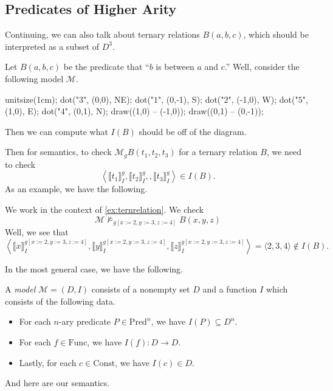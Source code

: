 \documentclass[../notes.tex]{subfiles}
\begin{document}
\subsection{Predicates of Higher Arity}
Continuing, we can also talk about ternary relations $B(a,b,c)$, which should be interpreted as a subset of $D^3$.
\begin{example} \label{ex:ternrelation}
	Let $B(a,b,c)$ be the predicate that ``$b$ is between $a$ and $c$.'' Well, consider the following model $\mathcal M$.
	\begin{center}
		\begin{asy}
			unitsize(1cm);
			dot("$3$", (0,0), NE);
			dot("$1$", (0,-1), S);
			dot("$2$", (-1,0), W);
			dot("$5$", (1,0), E);
			dot("$4$", (0,1), N);
			draw((1,0) -- (-1,0));
			draw((0,1) -- (0,-1));
		\end{asy}
	\end{center}
	Then we can compute what $I(B)$ should be off of the diagram.
\end{example}
Then for semantics, to check $\mathcal M_gB(t_1,t_2,t_3)$ for a ternary relation $B$, we need to check
\[\left\langle\llbracket t_1\rrbracket_I^g,\llbracket t_2\rrbracket_I^g,,\llbracket t_3\rrbracket_I^g\right\rangle\in I(B).\]
As an example, we have the following.
\begin{example}
	We work in the context of \autoref{ex:ternrelation}. We check
	\[\mathcal M\nvDash_{g[x:=2,y:=3,z:=4]}B(x,y,z)\]
	Well, we see that
	\[\left\langle\llbracket x\rrbracket_I^{g[x:=2,y:=3,z:=4]},\llbracket y\rrbracket_I^{g[x:=2,y:=3,z:=4]},\llbracket z\rrbracket_I^{g[x:=2,y:=3,z:=4]}\right\rangle=\langle2,3,4\rangle\notin I(B).\]
\end{example}
In the most general case, we have the following.
\begin{defihelper}[Model]
	A \textit{model} $\mathcal M=(D,I)$ consists of a nonempty set $D$ and a function $I$ which consists of the following data.
	\begin{itemize}
		\item For each $n$-ary predicate $P\in\mathrm{Pred}^n$, we have $I(P)\subseteq D^n$.
		\item For each $f\in\mathrm{Func}$, we have $I(f):D\to D$.
		\item Lastly, for each $c\in\mathrm{Const}$, we have $I(c)\in D$.
	\end{itemize}
\end{defihelper}
And here are our semantics.
\end{document}
